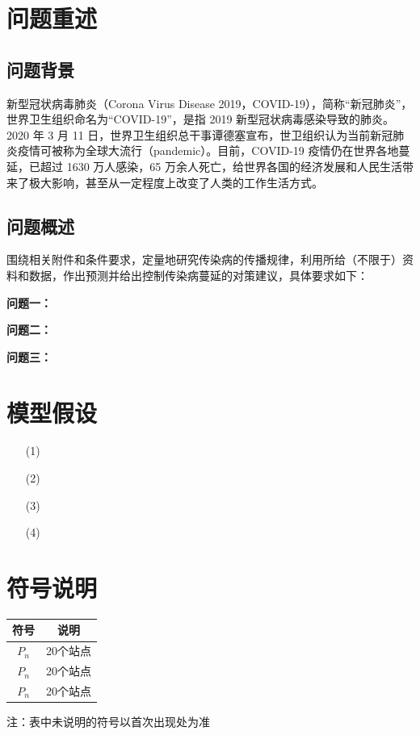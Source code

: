 \documentclass{whutmod}
\begin{document}
	\thispagestyle{empty}
	\tableofcontents
	\setcounter{page}{0}                                               
	\newpage	%
	

	
	\section{问题重述}	
		\subsection{问题背景}
	    	新型冠状病毒肺炎（Corona Virus Disease 2019，COVID-19），简称“新冠肺炎”，世界卫生组织命名为“COVID-19”，是指 2019 新型冠状病毒感染导致的肺炎。2020 年 3 月 11 日，世界卫生组织总干事谭德塞宣布，世卫组织认为当前新冠肺炎疫情可被称为全球大流行（pandemic）。目前，COVID-19 疫情仍在世界各地蔓延，已超过 1630 万人感染，65 万余人死亡，给世界各国的经济发展和人民生活带来了极大影响，甚至从一定程度上改变了人类的工作生活方式。
	
		\subsection{问题概述}
		    围绕相关附件和条件要求，定量地研究传染病的传播规律，利用所给（不限于）资料和数据，作出预测并给出控制传染病蔓延的对策建议，具体要求如下：
				 
			
			\textbf{问题一：}
			
			\textbf{问题二：}
			
			\textbf{问题三：}

	
	\section{模型假设}
		\begin{itemize}                                             
		\item [(1)] 
		\item [(2)]
		\item [(3)] 
		\item [(4)] 
		\end{itemize}

		
	\section{符号说明}
		\begin{table}[H]
		\centering
		\setlength{\tabcolsep}{12mm}
		\begin{tabular}{cc}
			\toprule[1.5pt]
			\multicolumn{1}{m{5cm}}{\centering 符号} & \multicolumn{1}{m{5cm}}{\centering 说明} \\
			\midrule[1pt]		
			$P_n$  & 20个站点  \\ 
			$P_n$  & 20个站点  \\ 
		   	$P_n$  & 20个站点  \\ 
			\bottomrule[1.5pt]
		\end{tabular}
		\begin{tablenotes}
		\item 注：表中未说明的符号以首次出现处为准
		\end{tablenotes}
		\end{table}
\end{document}
